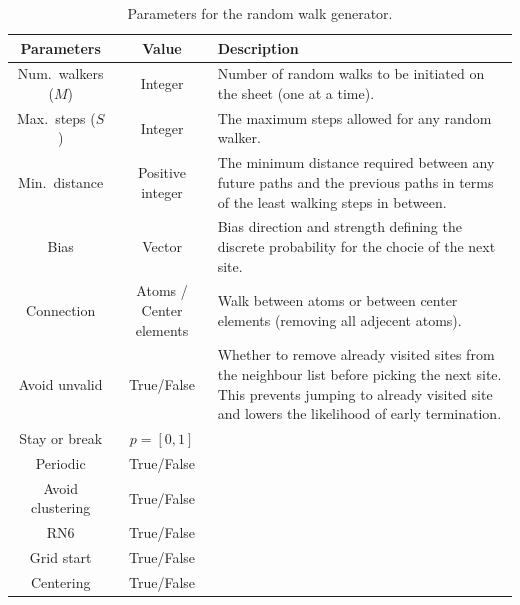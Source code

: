 \begin{table}[H]
  \begin{center}
  \caption{Parameters for the random walk generator.}
  \label{tab:RW_params}
  \begin{tabular}{ | c | c | m{8cm} |} \hline
  \textbf{Parameters} & \textbf{Value} & \textbf{Description}  \\ \hline
  Num.\ walkers ($M$) & Integer & Number of random walks to be initiated on the sheet (one at a time). \\ \hline
  Max.\ steps ($S$)  & Integer &The maximum steps allowed for any random walker. \\ \hline
  Min.\ distance  & Positive integer &The minimum distance required between any future paths and the previous paths in terms of the least walking steps in between. \\ \hline
  Bias  & Vector & Bias direction and strength defining the discrete probability for the chocie of the next site. \\ \hline
  Connection  & Atoms / Center elements & Walk between atoms or between center elements (removing all adjecent atoms). \\ \hline
  Avoid unvalid  & True/False & Whether to remove already visited sites from the neighbour list before picking the next site. This prevents jumping to already visited site and lowers the likelihood of early termination.  \\ \hline
  Stay or break  & $p = [0,1]$ & \\ \hline
  Periodic  & True/False & \\ \hline
  Avoid clustering  & True/False & \\ \hline
  RN6  & True/False & \\ \hline
  Grid start  & True/False & \\ \hline
  Centering  & True/False & \\ \hline
  \end{tabular}
  \end{center}
\end{table}

